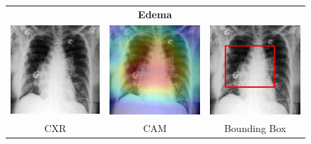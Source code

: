 \begin{figure}[htbp!]
\centering
\begin{tabular}{ccc}
 &\textbf{Edema}& \\
\vspace{2mm}
  \includegraphics[width=35mm]{Tesi/images/CAMs/CAM11/image.png} &   
  \includegraphics[width=35mm]{Tesi/images/CAMs/CAM11/image_cam.png} &   
  \includegraphics[width=35mm]{Tesi/images/CAMs/CAM11/image_bbox.png} \\
\footnotesize{CXR} & \footnotesize{CAM} & \footnotesize{Bounding Box} \\[6pt]
\end{tabular}
\caption[Edema CAM-2]{}
\label{fig:figure_5.25}
\end{figure}

\newpage

